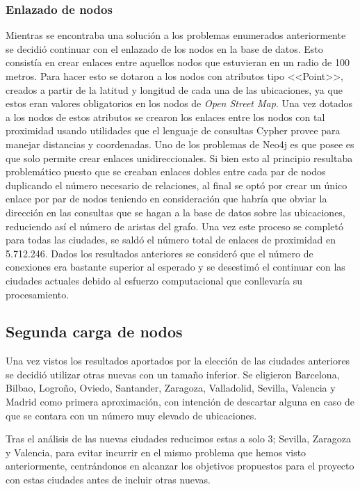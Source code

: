 \subsubsection{Enlazado de nodos}

Mientras se encontraba una solución a los problemas enumerados anteriormente se decidió continuar con el enlazado de los nodos en la base de datos. Esto consistía en crear enlaces entre aquellos nodos que estuvieran en un radio de 100 metros. Para hacer esto se dotaron a los nodos con atributos tipo <<Point>>, creados a partir de la latitud y longitud de cada una de las ubicaciones, ya que estos eran valores obligatorios en los nodos de \textit{Open Street Map}. Una vez dotados a los nodos de estos atributos se crearon los enlaces entre los nodos con tal proximidad usando utilidades que el lenguaje de consultas Cypher provee para manejar distancias y coordenadas. Uno de los problemas de Neo4j es que posee es que solo permite crear enlaces unidireccionales. Si bien esto al principio resultaba problemático puesto que se creaban enlaces dobles entre cada par de nodos duplicando el número necesario de relaciones, al final se optó por crear un único enlace por par de nodos teniendo en consideración que habría que obviar la dirección en las consultas que se hagan a la base de datos sobre las ubicaciones, reduciendo así el número de aristas del grafo. Una vez este proceso se completó para todas las ciudades, se saldó el número total de enlaces de proximidad en 5.712.246. Dados los resultados anteriores se consideró que el número de conexiones era bastante superior al esperado y se desestimó el continuar con las ciudades actuales debido al esfuerzo computacional que conllevaría su procesamiento.


\subsection{Segunda carga de nodos}

Una vez vistos los resultados aportados por la elección de las ciudades anteriores se decidió utilizar otras nuevas con un tamaño inferior. Se eligieron Barcelona, Bilbao, Logroño, Oviedo, Santander, Zaragoza, Valladolid, Sevilla, Valencia y Madrid como primera aproximación, con intención de descartar alguna en caso de que se contara con un número muy elevado de ubicaciones.

Tras el análisis de las nuevas ciudades reducimos estas a solo 3; Sevilla, Zaragoza y Valencia, para evitar incurrir en el mismo problema que hemos visto anteriormente, centrándonos en alcanzar los objetivos propuestos para el proyecto con estas ciudades antes de incluir otras nuevas.

